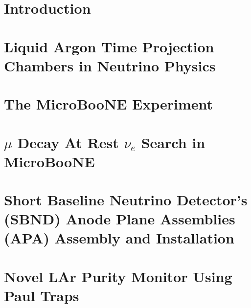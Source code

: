 \documentclass[twoside,openright,12pt,a4paper]{report}
\begin{document}
\capa
\adedicatoria
\notaagradecimento
\acitacao
\tableofcontents
\listoffigures 
\listoftables
\linenumbers

\inicio

\chapter{Introduction}


\chapter{Liquid Argon Time Projection Chambers in Neutrino Physics}


\chapter{The MicroBooNE Experiment}


\chapter{$\mu$ Decay At Rest $\nu_{e}$ Search in MicroBooNE}


\chapter{Short Baseline Neutrino Detector's (SBND) Anode Plane Assemblies (APA) Assembly and Installation}


\chapter{Novel LAr Purity Monitor Using Paul Traps}


\appendix %
\isappendixtrue %

%






\begin{thebibliography}{10}






\end{thebibliography}

\end{document}
